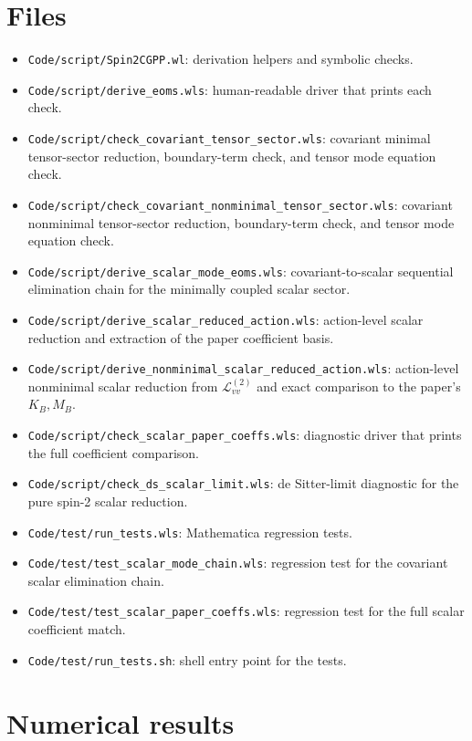 \documentclass[11pt]{article}
\begin{document}
\section{Files}
\begin{itemize}[leftmargin=1.5em]
\item \texttt{Code/script/Spin2CGPP.wl}: derivation helpers and symbolic checks.
\item \texttt{Code/script/derive\_eoms.wls}: human-readable driver that prints each check.
\item \texttt{Code/script/check\_covariant\_tensor\_sector.wls}: covariant minimal tensor-sector reduction, boundary-term check, and tensor mode equation check.
\item \texttt{Code/script/check\_covariant\_nonminimal\_tensor\_sector.wls}: covariant nonminimal tensor-sector reduction, boundary-term check, and tensor mode equation check.
\item \texttt{Code/script/derive\_scalar\_mode\_eoms.wls}: covariant-to-scalar sequential elimination chain for the minimally coupled scalar sector.
\item \texttt{Code/script/derive\_scalar\_reduced\_action.wls}: action-level scalar reduction and extraction of the paper coefficient basis.
\item \texttt{Code/script/derive\_nonminimal\_scalar\_reduced\_action.wls}: action-level nonminimal scalar reduction from \(\mathcal L_{vv}^{(2)}\) and exact comparison to the paper's \(K_B,M_B\).
\item \texttt{Code/script/check\_scalar\_paper\_coeffs.wls}: diagnostic driver that prints the full coefficient comparison.
\item \texttt{Code/script/check\_ds\_scalar\_limit.wls}: de Sitter-limit diagnostic for the pure spin-2 scalar reduction.
\item \texttt{Code/test/run\_tests.wls}: Mathematica regression tests.
\item \texttt{Code/test/test\_scalar\_mode\_chain.wls}: regression test for the covariant scalar elimination chain.
\item \texttt{Code/test/test\_scalar\_paper\_coeffs.wls}: regression test for the full scalar coefficient match.
\item \texttt{Code/test/run\_tests.sh}: shell entry point for the tests.
\end{itemize}

\section{Numerical results}
\label{sec:numerical}
\end{document}
